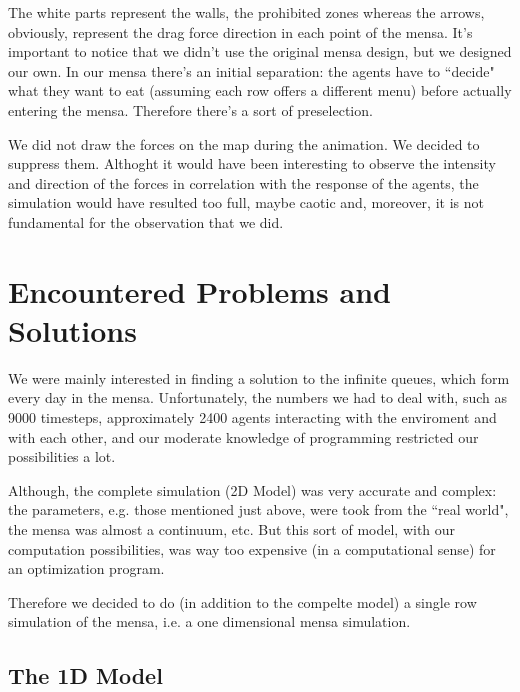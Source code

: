 \documentclass[11pt]{article}
\begin{document}
The white parts represent the walls, the prohibited zones whereas the arrows, obviously, represent the drag force direction in each point of the mensa. It's important to notice that we didn't use the original mensa design, but we designed our own. In our mensa there's an initial separation: the agents have to ``decide" what they want to eat (assuming each row offers a different menu) before actually entering the mensa. Therefore there's a sort of preselection.

We did not draw the forces on the map during the animation. We decided to suppress them. Althoght it would have been interesting to observe the intensity and direction of the forces in correlation with the response of the agents, the simulation would have resulted too full, maybe caotic and, moreover, it is not fundamental for the observation that we did.

\newpage
\section{Encountered Problems and Solutions}

We were mainly interested in finding a solution to the infinite queues, which form every day in the mensa. Unfortunately, the numbers we had to deal with, such as 9000 timesteps, approximately 2400 agents interacting with the enviroment and with each other, and our moderate knowledge of programming restricted our possibilities a lot.

Although, the complete simulation (2D Model) was very accurate and complex: the parameters, e.g. those mentioned just above, were took from the ``real world", the mensa was almost a continuum, etc. But this sort of model, with our computation possibilities, was way too expensive (in a computational sense) for an optimization program.

Therefore we decided to do (in addition to the compelte model) a single row simulation of the mensa, i.e. a one dimensional mensa simulation.

\subsection{The 1D Model}
\end{document}

